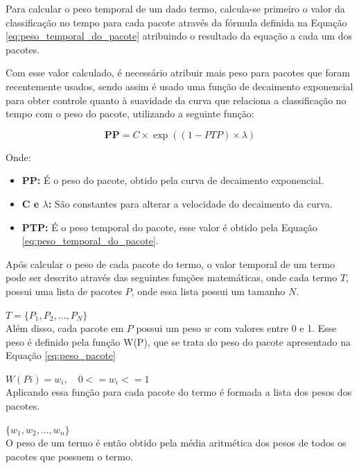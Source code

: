 Para calcular o peso temporal de um dado termo, calcula-se primeiro o valor da
classificação no tempo para cada pacote através da fórmula definida na Equação
\ref{eq:peso_temporal_do_pacote} atribuindo o resultado da equação a cada um
dos pacotes.

Com esse valor calculado, é necessário atribuir mais peso para pacotes que
foram recentemente usados, sendo assim é usado uma função de decaimento
exponencial para obter controle quanto à suavidade da curva que relaciona
a classificação no tempo com o peso do pacote, utilizando a seguinte função:

\begin{equation} \label{eq:peso_pacote}
\textbf{PP} = C \times \exp\left(({1 - PTP}) \times {\lambda}\right)
\end{equation}

Onde:

\begin{itemize}
    \item \textbf{PP:} É o peso do pacote, obtido pela curva de
    decaimento exponencial.
    \item \textbf{C e $\lambda$:} São constantes para alterar a velocidade do
    decaimento da curva.
    \item \textbf{PTP:} É o peso temporal do pacote, esse valor é obtido pela
    Equação \ref{eq:peso_temporal_do_pacote}.
\end{itemize}

Após calcular o peso de cada pacote do termo, o valor temporal de um termo pode ser
descrito através das seguintes funções matemáticas, onde cada termo $T$, possui uma
lista de pacotes $P$, onde essa lista possui um tamanho $N$.

$T = \{P_1, P_2, ..., P_N\}$
\\

Além disso, cada pacote em $P$ possui um peso $w$ com valores entre 0 e 1.
Esse peso é definido pela função W(P), que se trata do peso do pacote
apresentado na Equação \ref{eq:peso_pacote}

$W(Pi) = w_i , \quad 0 <= w_i <= 1$
\\

Aplicando essa função para cada pacote do termo é formada a lista dos pesos
dos pacotes.

$\{w_1, w_2, ..., w_n\}$
\\

O peso de um termo é então obtido pela média aritmética dos pesos de todos os
pacotes que possuem o termo.

